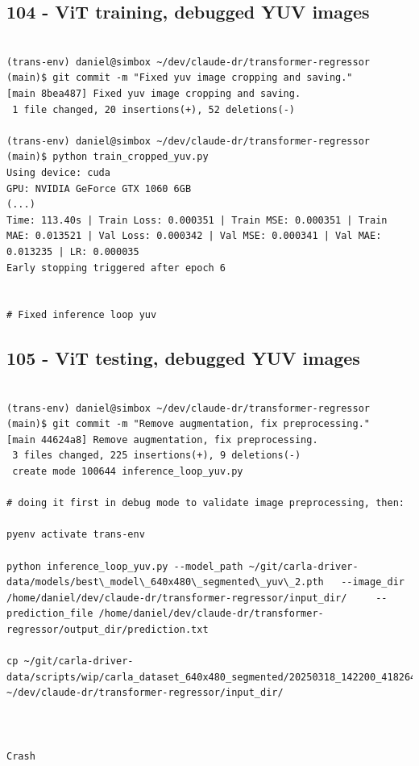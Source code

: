 \subsection{104 - ViT training, debugged YUV images}
\label{app_res:104}

\begin{verbatim}

(trans-env) daniel@simbox ~/dev/claude-dr/transformer-regressor (main)$ git commit -m "Fixed yuv image cropping and saving."
[main 8bea487] Fixed yuv image cropping and saving.
 1 file changed, 20 insertions(+), 52 deletions(-)

(trans-env) daniel@simbox ~/dev/claude-dr/transformer-regressor (main)$ python train_cropped_yuv.py 
Using device: cuda
GPU: NVIDIA GeForce GTX 1060 6GB
(...)
Time: 113.40s | Train Loss: 0.000351 | Train MSE: 0.000351 | Train MAE: 0.013521 | Val Loss: 0.000342 | Val MSE: 0.000341 | Val MAE: 0.013235 | LR: 0.000035
Early stopping triggered after epoch 6


# Fixed inference loop yuv

\end{verbatim}

\subsection{105 - ViT testing, debugged YUV images}
\label{app_res:105}

\begin{verbatim}

(trans-env) daniel@simbox ~/dev/claude-dr/transformer-regressor (main)$ git commit -m "Remove augmentation, fix preprocessing."
[main 44624a8] Remove augmentation, fix preprocessing.
 3 files changed, 225 insertions(+), 9 deletions(-)
 create mode 100644 inference_loop_yuv.py

# doing it first in debug mode to validate image preprocessing, then:

pyenv activate trans-env

python inference_loop_yuv.py --model_path ~/git/carla-driver-data/models/best\_model\_640x480\_segmented\_yuv\_2.pth   --image_dir /home/daniel/dev/claude-dr/transformer-regressor/input_dir/     --prediction_file /home/daniel/dev/claude-dr/transformer-regressor/output_dir/prediction.txt

cp ~/git/carla-driver-data/scripts/wip/carla_dataset_640x480_segmented/20250318_142200_418264_steering_0.0000.jpg ~/dev/claude-dr/transformer-regressor/input_dir/



Crash

\end{verbatim}

